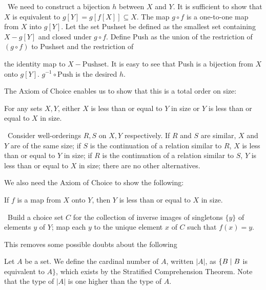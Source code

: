 \preuve\ We need to construct a bijection $h$ between $X$ and
$Y$.  It is sufficient to show that $X$ is equivalent to $g[Y] = g[f[X]] \subseteq X$.  The map $g\circ f$ is a
one-to-one map from $X$ into $g[Y]$.
Let the set Pushset be defined as the smallest set containing $X - g[Y]$ and
closed under $g\circ f$.
Define Push as the union of the restriction of $(g\circ f)$ to Pushset and the
restriction of\linebreak

\pagebreak

the identity map to $X - \mbox{Pushset}$.
It is easy to see that Push is a bijection from
$X$ onto $g[Y]$.
$g^{-1} \circ \mbox{Push}$ is the desired $h$.
\finpreuve

The Axiom of Choice enables us to show that this is a
total order on size:

\begin{thm}
 For any sets $X,Y$, either $X$ is less than or equal to $Y$ in size
 or $Y$ is less than or equal to $X$ in size.
\end{thm}

\preuve\ Consider well-orderings $R,S$ on $X,Y$
respectively.  If $R$ and $S$ 
are similar, $X$ and $Y$ are of the same size; if $S$ is the
continuation of a relation similar to $R$, $X$ is less than or equal to $Y$ in
size; if $R$ is the continuation of a relation similar to $S$, $Y$ is less than
or equal to $X$ in size; there are no other alternatives.
\finpreuve

We also need the Axiom of Choice to show the following:

\begin{thm}
 If $f$ is a map from $X$ onto $Y$, then $Y$ is less than or
 equal to $X$ in size.
\end{thm}

\preuve\ Build a choice set $C$ for the collection of inverse images of singletons $\{y\}$ of elements $y$ of $Y$;
map each $y$ to the unique element $x$ of $C$ such that $f(x) = y$.
\finpreuve

This removes some possible doubts about the following

\begin{definition}
 Let $A$ be a set.  We define the {\upshape cardinal number} of $A$, written
 $|A|$, as $\{B \mid B$ is equivalent to 
 $A\}$, which exists by the Stratified Comprehension Theorem.  Note that the type of
 $|A|$ is one higher than the type of $A$.
\end{definition}


